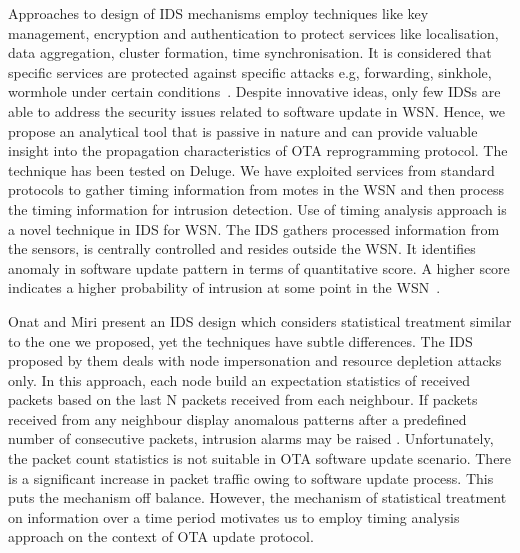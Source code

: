 \documentclass[conference,final]{IEEEtran}
\begin{document}
Approaches to design of IDS mechanisms %
employ techniques like key management, encryption and authentication to protect services like localisation, data aggregation, cluster formation, time synchronisation.
It is considered that specific services are protected against specific attacks e.g, forwarding, sinkhole, wormhole under certain conditions~\cite{1639675, 6096939, sink08, 5172466}.
Despite innovative ideas, only few IDSs are able to address the security issues related to software update in WSN.
Hence, we propose an analytical tool that is passive in nature and can provide valuable insight into the propagation characteristics of OTA reprogramming protocol. 
The technique has been tested on Deluge.
We have exploited services from standard protocols to gather timing information from motes in  the WSN and then process the timing information for intrusion detection.
Use of timing analysis approach is a novel technique in IDS for WSN.
The IDS  gathers processed information from the sensors, is centrally controlled and resides outside the WSN.
It  identifies anomaly in software update pattern in terms of quantitative score. 
A higher score indicates a higher probability of intrusion at some point in the WSN~\cite{aalam14}. 

Onat and Miri present an IDS design which considers statistical treatment similar to the one we proposed, yet the techniques have subtle differences.
The IDS proposed by them deals with node impersonation and resource depletion attacks only.
In this approach, each node build an expectation statistics of received packets based on the last N packets received from each neighbour.
If packets received from any neighbour display anomalous patterns after a predefined number of consecutive packets, intrusion alarms may be raised \cite{1512911}.
Unfortunately, the  packet count statistics is not suitable in OTA software update scenario.
There is a significant increase in packet traffic owing to software update process. 
This puts the mechanism off balance.
However, the mechanism of statistical treatment on information over a time period motivates us to employ timing analysis approach on the context of OTA update protocol.
\end{document}
